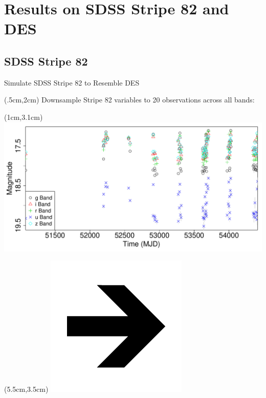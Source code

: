 \documentclass[12pt]{beamer}
\begin{document}


\section{Results on SDSS Stripe 82 and DES}


\subsection{SDSS Stripe 82}

\begin{frame}{Simulate SDSS Stripe 82 to Resemble DES}

  \begin{textblock*}{12cm}(.5cm,2cm) %
Downsample Stripe 82 variables to 20 observations across all bands:
\end{textblock*}

  \begin{textblock*}{3cm}(1cm,3.1cm) %
\includegraphics[scale=.15]{figs/unfolded_13350.pdf}
\end{textblock*}


  \begin{textblock*}{3cm}(5.5cm,3.5cm) %
\includegraphics[scale=.15]{figs/rightarrow.png}
\end{textblock*}


\end{frame}
\end{document}
